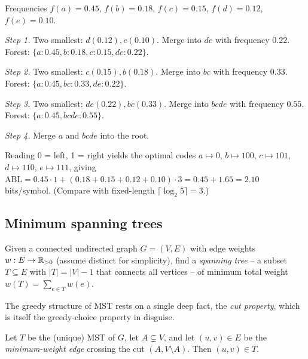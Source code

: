 \begin{example}
\label{ex:huffman_run}
Frequencies $f(a)=0.45$, $f(b)=0.18$, $f(c)=0.15$, $f(d)=0.12$, $f(e)=0.10$.

\medskip
\noindent\textit{Step 1.} Two smallest: $d(0.12), e(0.10)$. Merge into $de$ with frequency $0.22$. Forest: $\{a:0.45, b:0.18, c:0.15, de:0.22\}$.

\medskip
\noindent\textit{Step 2.} Two smallest: $c(0.15), b(0.18)$. Merge into $bc$ with frequency $0.33$. Forest: $\{a:0.45, bc:0.33, de:0.22\}$.

\medskip
\noindent\textit{Step 3.} Two smallest: $de(0.22), bc(0.33)$. Merge into $bcde$ with frequency $0.55$. Forest: $\{a:0.45, bcde:0.55\}$.

\medskip
\noindent\textit{Step 4.} Merge $a$ and $bcde$ into the root.

\medskip
Reading 0 = left, 1 = right yields the optimal codes $a \mapsto 0$, $b \mapsto 100$, $c \mapsto 101$, $d \mapsto 110$, $e \mapsto 111$, giving $\mathrm{ABL} = 0.45 \cdot 1 + (0.18+0.15+0.12+0.10) \cdot 3 = 0.45 + 1.65 = 2.10$ bits/symbol. (Compare with fixed-length $\lceil \log_2 5 \rceil = 3$.)
\end{example}

\subsection{Minimum spanning trees}

\begin{example}[Setup]
\label{ex:mst_setup}
Given a connected undirected graph $G=(V,E)$ with edge weights $w : E \to \mathbb{R}_{>0}$ (assume distinct for simplicity), find a \emph{spanning tree} -- a subset $T \subseteq E$ with $|T|=|V|-1$ that connects all vertices -- of minimum total weight $w(T) = \sum_{e \in T} w(e)$.
\end{example}

The greedy structure of MST rests on a single deep fact, the \emph{cut property}, which is itself the greedy-choice property in disguise.

\begin{theorem}
\label{thm:mst_cut_property}
Let $T$ be the (unique) MST of $G$, let $A \subsetneq V$, and let $(u,v) \in E$ be the \emph{minimum-weight edge} crossing the cut $(A, V \setminus A)$. Then $(u,v) \in T$.
\end{theorem}

